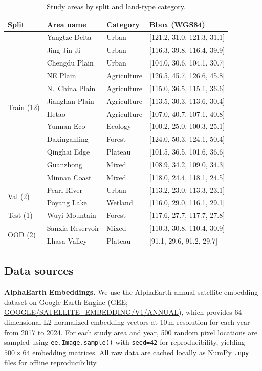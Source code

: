 \documentclass{article}
\begin{document}
\begin{table}[htbp]
\centering
\caption{Study areas by split and land-type category.}
\label{tab:areas}
\begin{tabular}{llll}
\toprule
Split & Area name & Category & Bbox (WGS84) \\
\midrule
\multirow{12}{*}{Train (12)} & Yangtze Delta & Urban & [121.2, 31.0, 121.3, 31.1] \\
 & Jing-Jin-Ji & Urban & [116.3, 39.8, 116.4, 39.9] \\
 & Chengdu Plain & Urban & [104.0, 30.6, 104.1, 30.7] \\
 & NE Plain & Agriculture & [126.5, 45.7, 126.6, 45.8] \\
 & N.~China Plain & Agriculture & [115.0, 36.5, 115.1, 36.6] \\
 & Jianghan Plain & Agriculture & [113.5, 30.3, 113.6, 30.4] \\
 & Hetao & Agriculture & [107.0, 40.7, 107.1, 40.8] \\
 & Yunnan Eco & Ecology & [100.2, 25.0, 100.3, 25.1] \\
 & Daxinganling & Forest & [124.0, 50.3, 124.1, 50.4] \\
 & Qinghai Edge & Plateau & [101.5, 36.5, 101.6, 36.6] \\
 & Guanzhong & Mixed & [108.9, 34.2, 109.0, 34.3] \\
 & Minnan Coast & Mixed & [118.0, 24.4, 118.1, 24.5] \\
\midrule
\multirow{2}{*}{Val (2)} & Pearl River & Urban & [113.2, 23.0, 113.3, 23.1] \\
 & Poyang Lake & Wetland & [116.0, 29.0, 116.1, 29.1] \\
\midrule
Test (1) & Wuyi Mountain & Forest & [117.6, 27.7, 117.7, 27.8] \\
\midrule
\multirow{2}{*}{OOD (2)} & Sanxia Reservoir & Mixed & [110.3, 30.8, 110.4, 30.9] \\
 & Lhasa Valley & Plateau & [91.1, 29.6, 91.2, 29.7] \\
\bottomrule
\end{tabular}
\end{table}

\subsection{Data sources}

\textbf{AlphaEarth Embeddings.} We use the AlphaEarth annual satellite embedding dataset on Google Earth Engine (GEE; \url{GOOGLE/SATELLITE_EMBEDDING/V1/ANNUAL}), which provides 64-dimensional L2-normalized embedding vectors at 10\,m resolution for each year from 2017 to 2024. For each study area and year, 500 random pixel locations are sampled using \texttt{ee.Image.sample()} with \texttt{seed=42} for reproducibility, yielding $500\times64$ embedding matrices. All raw data are cached locally as NumPy \texttt{.npy} files for offline reproducibility.
\end{document}
